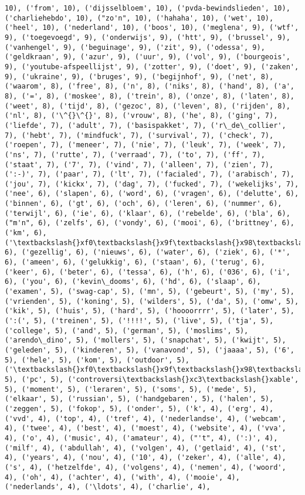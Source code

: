 \documentclass{article}
\begin{document}
\begin{Verbatim}[commandchars=\\\{\}]
10), ('from', 10), ('dijsselbloem', 10), ('pvda-bewindslieden', 10), ('charliehebdo', 10), ("zo'n", 10), ('hahaha', 10), ('wet', 10), ('heel', 10), ('nederland', 10), ('boos', 10), ('meglena', 9), ('wtf', 9), ('toegevoegd', 9), ('onderwijs', 9), ('htt', 9), ('brussel', 9), ('vanhengel', 9), ('beguinage', 9), ('zit', 9), ('odessa', 9), ('geldkraan', 9), ('azur', 9), ('uur', 9), ('vol', 9), ('bourgeois', 9), ('youtube-afspeellijst', 9), ('zotter', 9), ('doet', 9), ('zaken', 9), ('ukraine', 9), ('bruges', 9), ('begijnhof', 9), ('net', 8), ('waarom', 8), ('free', 8), ('n', 8), ('niks', 8), ('hand', 8), ('a', 8), ('=', 8), ('moskee', 8), ('trein', 8), ('onze', 8), ('laten', 8), ('weet', 8), ('tijd', 8), ('gezoc', 8), ('leven', 8), ('rijden', 8), ('nl', 8), ('\^{}\^{}', 8), ('vrouw', 8), ('he', 8), ('ging', 7), ('liefde', 7), ('adult', 7), ('basispakket', 7), ('r\_de\_collier', 7), ('hebt', 7), ('mindfuck', 7), ('survival', 7), ('check', 7), ('roepen', 7), ('meneer', 7), ('nie', 7), ('leuk', 7), ('week', 7), ('ns', 7), ('rutte', 7), ('verraad', 7), ('to', 7), ('ff', 7), ('staat', 7), ('7', 7), ('vind', 7), ('alleen', 7), ('zien', 7), (':-)', 7), ('paar', 7), ('lt', 7), ('facialed', 7), ('arabisch', 7), ('jou', 7), ('kickx', 7), ('dag', 7), ('fucked', 7), ('wekelijks', 7), ('nee', 6), ('slapen', 6), ('word', 6), ('vragen', 6), ('delutte', 6), ('binnen', 6), ('gt', 6), ('och', 6), ('leren', 6), ('nummer', 6), ('terwijl', 6), ('ie', 6), ('klaar', 6), ('rebelde', 6), ('bla', 6), ("m'n", 6), ('zelfs', 6), ('vondy', 6), ('mooi', 6), ('brittney', 6), ('km', 6), ('\textbackslash{}xf0\textbackslash{}x9f\textbackslash{}x98\textbackslash{}xad', 6), ('gezellig', 6), ('nieuws', 6), ('water', 6), ('ziek', 6), ('*', 6), ('ameen', 6), ('gelukkig', 6), ('staan', 6), ('terug', 6), ('keer', 6), ('beter', 6), ('tessa', 6), ('h', 6), ('036', 6), ('i', 6), ('you', 6), ('kevin\_dooms', 6), ('hd', 6), ('slaap', 6), ('examen', 5), ('swag-cap', 5), ('mn', 5), ('gebeurt', 5), ('my', 5), ('vrienden', 5), ('koning', 5), ('wilders', 5), ('da', 5), ('omw', 5), ('kik', 5), ('huis', 5), ('hard', 5), ('hoooorrrr', 5), ('later', 5), (':(', 5), ('treinen', 5), ('!!!!', 5), ('live', 5), ('tja', 5), ('college', 5), ('and', 5), ('german', 5), ('moslims', 5), ('arendo\_dino', 5), ('mollers', 5), ('snapchat', 5), ('kwijt', 5), ('geleden', 5), ('kinderen', 5), ('vanavond', 5), ('jaaaa', 5), ('6', 5), ('hele', 5), ('kom', 5), ('outdoor', 5), ('\textbackslash{}xf0\textbackslash{}x9f\textbackslash{}x98\textbackslash{}xab', 5), ('pc', 5), ('controversi\textbackslash{}xc3\textbackslash{}xable', 5), ('moment', 5), ('leraren', 5), ('soms', 5), ('mede', 5), ('elkaar', 5), ('russian', 5), ('handgebaren', 5), ('halen', 5), ('zeggen', 5), ('fokop', 5), ('onder', 5), ('k', 4), ('erg', 4), ('vvd', 4), ('top', 4), ('tref', 4), ('nederlandse', 4), ('webcam', 4), ('twee', 4), ('best', 4), ('moest', 4), ('website', 4), ('vva', 4), ('o', 4), ('music', 4), ('amateur', 4), ("'t", 4), (':)', 4), ('milf', 4), ('abdullah', 4), ('volgen', 4), ('getlaid', 4), ('st', 4), ('years', 4), ('nou', 4), ('10', 4), ('zeker', 4), ('alle', 4), ('s', 4), ('hetzelfde', 4), ('volgens', 4), ('nemen', 4), ('woord', 4), ('oh', 4), ('achter', 4), ('with', 4), ('mooie', 4), ('nederlands', 4), ('\ldots', 4), ('charlie', 4), 
\end{Verbatim}
\end{document}
